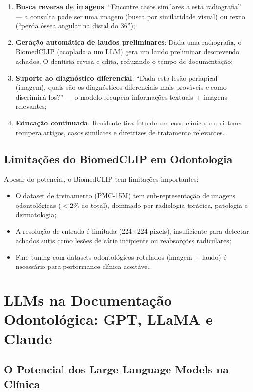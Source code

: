 \begin{enumerate}
    \item \textbf{Busca reversa de imagens}: ``Encontre casos similares a esta radiografia'' --- a consulta pode ser uma imagem (busca por similaridade visual) ou texto (``perda óssea angular na distal do 36'');

    \item \textbf{Geração automática de laudos preliminares}: Dada uma radiografia, o BiomedCLIP (acoplado a um LLM) gera um laudo preliminar descrevendo achados. O dentista revisa e edita, reduzindo o tempo de documentação;

    \item \textbf{Suporte ao diagnóstico diferencial}: ``Dada esta lesão periapical (imagem), quais são os diagnósticos diferenciais mais prováveis e como discriminá-los?'' --- o modelo recupera informações textuais + imagens relevantes;

    \item \textbf{Educação continuada}: Residente tira foto de um caso clínico, e o sistema recupera artigos, casos similares e diretrizes de tratamento relevantes.
\end{enumerate}

\subsection{Limitações do BiomedCLIP em Odontologia}

Apesar do potencial, o BiomedCLIP tem limitações importantes:
\begin{itemize}
    \item O dataset de treinamento (PMC-15M) tem sub-representação de imagens odontológicas ($< 2\%$ do total), dominado por radiologia torácica, patologia e dermatologia;
    \item A resolução de entrada é limitada (224$\times$224 pixels), insuficiente para detectar achados sutis como lesões de cárie incipiente ou reabsorções radiculares;
    \item Fine-tuning com datasets odontológicos rotulados (imagem + laudo) é necessário para performance clínica aceitável.
\end{itemize}

\section{LLMs na Documentação Odontológica: GPT, LLaMA e Claude}

\subsection{O Potencial dos Large Language Models na Clínica}

